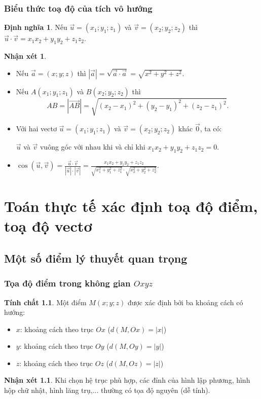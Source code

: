 \documentclass[12pt,a4paper,oneside]{book}
\theoremstyle{theorem}
\theoremstyle{definition}
\newtheorem{dn}[theorem2]{Định nghĩa}
\newtheorem{nx}[theorem2]{Nhận xét}
\newtheorem{tc}[theorem2]{Tính chất}
\begin{document}
    \subsection{Biểu thức toạ độ của tích vô hướng}
    \begin{dn}
        Nếu $\vec{u}=(x_1;y_1;z_1)$ và $\vec{v}=(x_2;y_2;z_2)$ thì $\vec{u}\cdot\vec{v}=x_1x_2+y_1y_2+z_1z_2$.
    \end{dn}
    \begin{nx}
        \begin{itemize}
            \item Nếu $\vec{a}=(x;y;z)$ thì $|\vec{a}|=\sqrt{\vec{a}\cdot\vec{a}}=\sqrt{x^2+y^2+z^2}$.
            \item Nếu $A(x_1;y_1;z_1)$ và $B(x_2;y_2;z_2)$ thì
                \[
                AB=|\overrightarrow{AB}|=\sqrt{(x_2-x_1)^2+(y_2-y_1)^2+(z_2-z_1)^2}.
                \]
            \item Với hai vectơ $\vec{u}=(x_1;y_1;z_1)$ và $\vec{v}=(x_2;y_2;z_2)$ khác $\vec{0}$, ta có:
            
            $\vec{u}$ và $\vec{v}$ vuông góc với nhau khi và chỉ khi $x_1x_2+y_1y_2+z_1z_2=0$.
            \item $\cos(\vec{u},\vec{v})=\displaystyle \frac{\vec{u}\cdot\vec{v}}{|\vec{u}|\cdot|\vec{v}|} =\frac{x_1x_2+y_1y_2+z_1z_2}{\sqrt{x_1^2+y_1^2+z_1^2}\cdot\sqrt{x_2^2+y_2^2+z_2^2}}$.
        \end{itemize}
    \end{nx}
    \chapter{Toán thực tế xác định toạ độ điểm, toạ độ vectơ}
    \section{Một số điểm lý thuyết quan trọng}
    \subsection{Tọa độ điểm trong không gian $Oxyz$}
    \begin{tc}
    Một điểm $M(x;y;z)$ được xác định bởi ba khoảng cách có hướng:
        \begin{itemize}
            \item $x$: khoảng cách theo trục $Ox$ ($d(M,Ox)=|x|$)
            \item $y$: khoảng cách theo trục $Oy$ ($d(M,Oy)=|y|$)
            \item $z$: khoảng cách theo trục $Oz$ ($d(M,Oz)=|z|$)
        \end{itemize}
    \end{tc}
    \begin{nx} Khi chọn hệ trục phù hợp, các đỉnh của hình lập phương, hình hộp chữ nhật, hình lăng trụ,... thường có tọa độ nguyên (dễ tính).
    \end{nx}
\end{document}
